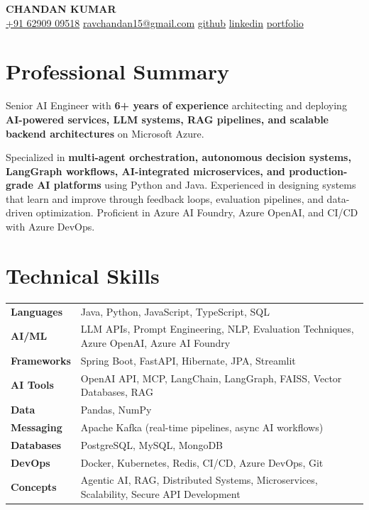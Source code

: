 \documentclass[10pt, letterpaper]{article}
\begin{document}
\begin{center}
{\LARGE\bfseries\color{primary} CHANDAN KUMAR}\\[4pt]

\small\color{subtle}
\href{tel:+916290909518}{+91 62909 09518} \quad
\href{mailto:ravchandan15@gmail.com}{ravchandan15@gmail.com} \quad
\href{https://github.com/RavSinghChandan}{github} \quad
\href{https://linkedin.com}{linkedin} \quad
\href{https://chandan-kumar-ai-engineer.vercel.app/}{portfolio}
\end{center}

\vspace{-2pt}

\section{Professional Summary}

\noindent Senior AI Engineer with \textbf{6+ years of experience} architecting and deploying \textbf{AI-powered services, LLM systems, RAG pipelines, and scalable backend architectures} on Microsoft Azure.

\vspace{3pt}

\noindent Specialized in \textbf{multi-agent orchestration, autonomous decision systems, LangGraph workflows, AI-integrated microservices, and production-grade AI platforms} using Python and Java. Experienced in designing systems that learn and improve through feedback loops, evaluation pipelines, and data-driven optimization. Proficient in Azure AI Foundry, Azure OpenAI, and CI/CD with Azure DevOps.

\section{Technical Skills}

\begin{tabularx}{\textwidth}{@{} l X @{}}
\textbf{Languages} & Java, Python, JavaScript, TypeScript, SQL \\[2pt]
\textbf{AI/ML} & LLM APIs, Prompt Engineering, NLP, Evaluation Techniques, Azure OpenAI, Azure AI Foundry \\[2pt]
\textbf{Frameworks} & Spring Boot, FastAPI, Hibernate, JPA, Streamlit \\[2pt]
\textbf{AI Tools} & OpenAI API, MCP, LangChain, LangGraph, FAISS, Vector Databases, RAG \\[2pt]
\textbf{Data} & Pandas, NumPy \\[2pt]
\textbf{Messaging} & Apache Kafka (real-time pipelines, async AI workflows) \\[2pt]
\textbf{Databases} & PostgreSQL, MySQL, MongoDB \\[2pt]
\textbf{DevOps} & Docker, Kubernetes, Redis, CI/CD, Azure DevOps, Git \\[2pt]
\textbf{Concepts} & Agentic AI, RAG, Distributed Systems, Microservices, Scalability, Secure API Development \\
\end{tabularx}
\end{document}
